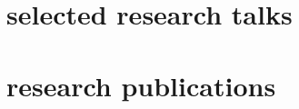 \documentclass[]{luger-cv} %
\begin{document}
\section{selected research talks}
%
\begin{list}{}{\pubslist}
    
\end{list}


%
\clearpage
{}
%
\section{research publications}
%
\begin{list}{}{\pubslist}
    
\end{list}
%
\vspace{1em}
\end{document}
